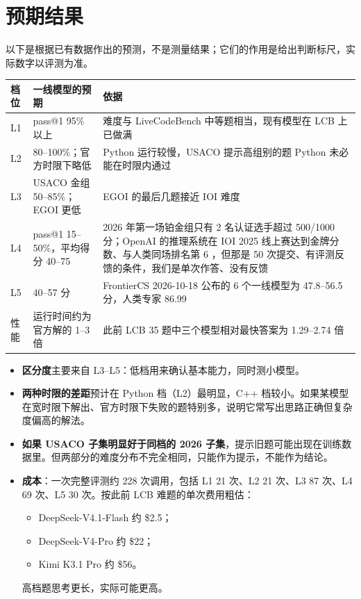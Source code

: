 \documentclass[11pt,a4paper,fontset=none]{ctexart}
\begin{document}
\section{预期结果}
以下是根据已有数据作出的预测，不是测量结果；它们的作用是给出判断标尺，实际数字以评测为准。
\begin{center}
\small
\begin{tabularx}{\linewidth}{@{}l>{\raggedright}p{3.6cm}L@{}}
\toprule
档位 & 一线模型的预期 & 依据 \\
\midrule
L1 & pass@1 95\% 以上 & 难度与 LiveCodeBench 中等题相当，现有模型在 LCB 上已做满 \\
L2 & 80--100\%；官方时限下略低 & Python 运行较慢，USACO 提示高组别的题 Python 未必能在时限内通过 \\
L3 & USACO 金组 50--85\%；EGOI 更低 & EGOI 的最后几题接近 IOI 难度 \\
L4 & pass@1 15--50\%，平均得分 40--75 & 2026 年第一场铂金组只有 2 名认证选手超过 500/1000 分；OpenAI 的推理系统在 IOI 2025 线上赛达到金牌分数、与人类同场排名第 6 \cite{oaiioi}，但那是 50 次提交、有评测反馈的条件，我们是单次作答、没有反馈 \\
L5 & 40--57 分 & FrontierCS 2026-10-18 公布的 6 个一线模型为 47.8--56.5 分，人类专家 86.99 \cite{fcs} \\
性能 & 运行时间约为官方解的 1--3 倍 & 此前 LCB 35 题中三个模型相对最快答案为 1.29--2.74 倍 \\
\bottomrule
\end{tabularx}
\end{center}
\begin{itemize}
  \item \textbf{区分度}主要来自 L3--L5：低档用来确认基本能力，同时测小模型。
  \item \textbf{两种时限的差距}预计在 Python 档（L2）最明显，C++ 档较小。如果某模型在宽时限下解出、官方时限下失败的题特别多，说明它常写出思路正确但复杂度偏高的解法。
  \item \textbf{如果 USACO 子集明显好于同档的 2026 子集}，提示旧题可能出现在训练数据里。但两部分的难度分布不完全相同，只能作为提示，不能作为结论。
  \item \textbf{成本}：一次完整评测约 228 次调用，包括 L1 21 次、L2 21 次、L3 87 次、L4 69 次、L5 30 次。按此前 LCB 难题的单次费用粗估：
    \begin{itemize}
      \item DeepSeek-V4.1-Flash 约 \$2.5；
      \item DeepSeek-V4-Pro 约 \$22；
      \item Kimi K3.1 Pro 约 \$56。
    \end{itemize}
    高档题思考更长，实际可能更高。
\end{itemize}
\end{document}
